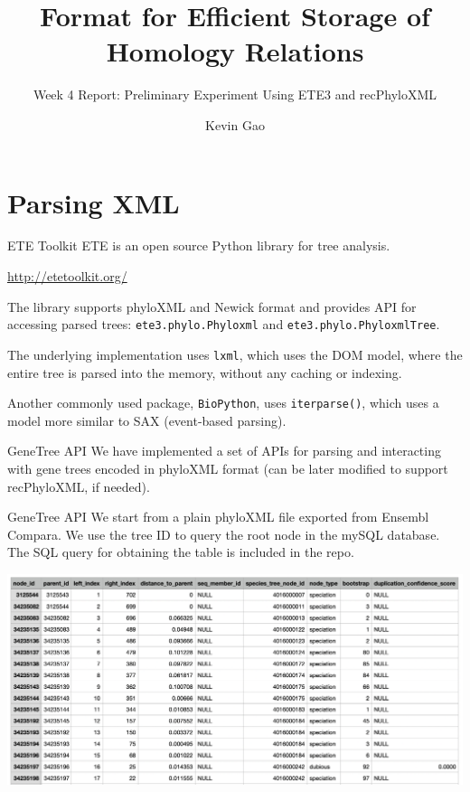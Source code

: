 \documentclass{beamer}
\title{Format for Efficient Storage of Homology Relations}
\subtitle{Week 4 Report: Preliminary Experiment Using ETE3 and recPhyloXML}
\author{Kevin Gao}
\institute{University of Toronto}
\begin{document}
\frame{\titlepage}


\section{Parsing XML}

\begin{frame}{ETE Toolkit}
    ETE is an open source Python library for tree analysis.

    \href{http://etetoolkit.org/}{http://etetoolkit.org/}

    The library supports phyloXML and Newick format and provides API for accessing parsed trees: \texttt{ete3.phylo.Phyloxml} and \texttt{ete3.phylo.PhyloxmlTree}.

    The underlying implementation uses \texttt{lxml}, which uses the DOM model, where the entire tree is parsed into the memory, without any caching or indexing.

    Another commonly used package, \texttt{BioPython}, uses \texttt{iterparse()}, which uses a model more similar to SAX (event-based parsing).
\end{frame}

\begin{frame}{GeneTree API}
    We have implemented a set of APIs for parsing and interacting with gene trees encoded in phyloXML format (can be later modified to support recPhyloXML, if needed).
\end{frame}

\begin{frame}{GeneTree API}
    We start from a plain phyloXML file exported from Ensembl Compara. We use the tree ID to query the root node in the mySQL database. The SQL query for obtaining the table is included in the repo.
    \begin{center}
        \includegraphics[width=0.9\linewidth]{res/ensembl_db.png}
    \end{center}
\end{frame}
\end{document}
